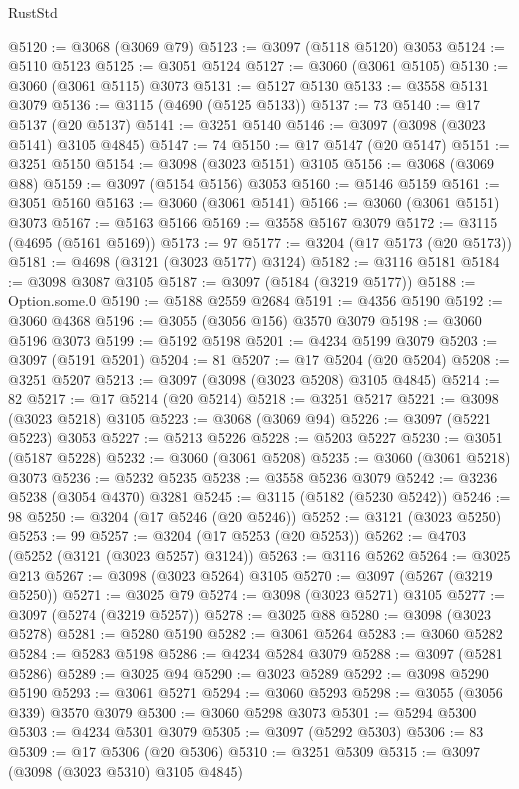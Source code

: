 \begin{lexlean}{RustStd}
\begin{coremodule}
{\begin{coremodule}
{{{{{{{{{{{{{{{{{{{{{{{{{{{{{{{{@5120 := @3068 (@3069 @79)
@5123 := @3097 (@5118 @5120) @3053
@5124 := @5110 @5123
@5125 := @3051 @5124
@5127 := @3060 (@3061 @5105)
@5130 := @3060 (@3061 @5115) @3073
@5131 := @5127 @5130
@5133 := @3558 @5131 @3079
@5136 := @3115 (@4690 (@5125 @5133))
@5137 := 73
@5140 := @17 @5137 (@20 @5137)
@5141 := @3251 @5140
@5146 := @3097 (@3098 (@3023 @5141) @3105 @4845)
@5147 := 74
@5150 := @17 @5147 (@20 @5147)
@5151 := @3251 @5150
@5154 := @3098 (@3023 @5151) @3105
@5156 := @3068 (@3069 @88)
@5159 := @3097 (@5154 @5156) @3053
@5160 := @5146 @5159
@5161 := @3051 @5160
@5163 := @3060 (@3061 @5141)
@5166 := @3060 (@3061 @5151) @3073
@5167 := @5163 @5166
@5169 := @3558 @5167 @3079
@5172 := @3115 (@4695 (@5161 @5169))
@5173 := 97
@5177 := @3204 (@17 @5173 (@20 @5173))
@5181 := @4698 (@3121 (@3023 @5177) @3124)
@5182 := @3116 @5181
@5184 := @3098 @3087 @3105
@5187 := @3097 (@5184 (@3219 @5177))
@5188 := Option.some.{0}
@5190 := @5188 @2559 @2684
@5191 := @4356 @5190
@5192 := @3060 @4368
@5196 := @3055 (@3056 @156) @3570 @3079
@5198 := @3060 @5196 @3073
@5199 := @5192 @5198
@5201 := @4234 @5199 @3079
@5203 := @3097 (@5191 @5201)
@5204 := 81
@5207 := @17 @5204 (@20 @5204)
@5208 := @3251 @5207
@5213 := @3097 (@3098 (@3023 @5208) @3105 @4845)
@5214 := 82
@5217 := @17 @5214 (@20 @5214)
@5218 := @3251 @5217
@5221 := @3098 (@3023 @5218) @3105
@5223 := @3068 (@3069 @94)
@5226 := @3097 (@5221 @5223) @3053
@5227 := @5213 @5226
@5228 := @5203 @5227
@5230 := @3051 (@5187 @5228)
@5232 := @3060 (@3061 @5208)
@5235 := @3060 (@3061 @5218) @3073
@5236 := @5232 @5235
@5238 := @3558 @5236 @3079
@5242 := @3236 @5238 (@3054 @4370) @3281
@5245 := @3115 (@5182 (@5230 @5242))
@5246 := 98
@5250 := @3204 (@17 @5246 (@20 @5246))
@5252 := @3121 (@3023 @5250)
@5253 := 99
@5257 := @3204 (@17 @5253 (@20 @5253))
@5262 := @4703 (@5252 (@3121 (@3023 @5257) @3124))
@5263 := @3116 @5262
@5264 := @3025 @213
@5267 := @3098 (@3023 @5264) @3105
@5270 := @3097 (@5267 (@3219 @5250))
@5271 := @3025 @79
@5274 := @3098 (@3023 @5271) @3105
@5277 := @3097 (@5274 (@3219 @5257))
@5278 := @3025 @88
@5280 := @3098 (@3023 @5278)
@5281 := @5280 @5190
@5282 := @3061 @5264
@5283 := @3060 @5282
@5284 := @5283 @5198
@5286 := @4234 @5284 @3079
@5288 := @3097 (@5281 @5286)
@5289 := @3025 @94
@5290 := @3023 @5289
@5292 := @3098 @5290 @5190
@5293 := @3061 @5271
@5294 := @3060 @5293
@5298 := @3055 (@3056 @339) @3570 @3079
@5300 := @3060 @5298 @3073
@5301 := @5294 @5300
@5303 := @4234 @5301 @3079
@5305 := @3097 (@5292 @5303)
@5306 := 83
@5309 := @17 @5306 (@20 @5306)
@5310 := @3251 @5309
@5315 := @3097 (@3098 (@3023 @5310) @3105 @4845)
}}}}}}}}}}}}}}}}}}}}}}}}}}}}}}}}
\end{coremodule}}
\end{coremodule}
\end{lexlean}
